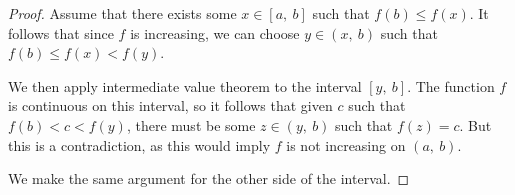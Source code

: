 \documentclass[10pt, oneside]{article}
\begin{document}
    \begin{proof}
      Assume that there exists some $x \in [a, \ b]$ such that $f(b) \leq f(x)$. It follows that since $f$ is increasing, we can choose $y \in (x, \ b)$ such
      that $f(b) \leq f(x) < f(y)$.
      \newline

      We then apply intermediate value theorem to the interval $[y, \ b]$. The function $f$ is continuous on this interval, so it follows that given $c$ such that
      $f(b) < c < f(y)$, there must be some $z \in (y, \ b)$ such that $f(z) = c$. But this is a contradiction, as this would imply $f$ is not increasing on $(a, \ b)$.
      \newline

      We make the same argument for the other side of the interval.
    \end{proof}

    
\end{document}
